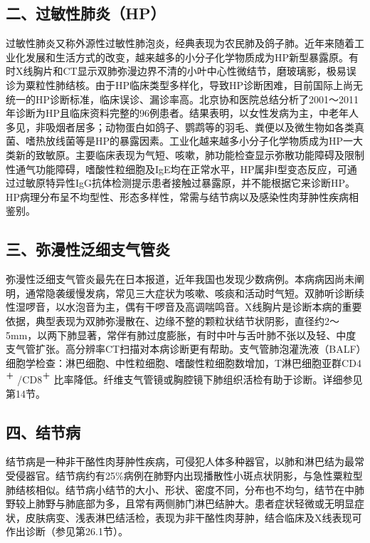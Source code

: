 \subsection{二、过敏性肺炎（HP）}

过敏性肺炎又称外源性过敏性肺泡炎，经典表现为农民肺及鸽子肺。近年来随着工业化发展和生活方式的改变，越来越多的小分子化学物质成为HP新型暴露原。有时X线胸片和CT显示双肺弥漫边界不清的小叶中心性微结节，磨玻璃影，极易误诊为粟粒性肺结核。由于HP临床类型多样化，导致HP诊断困难，目前国际上尚无统一的HP诊断标准，临床误诊、漏诊率高。北京协和医院总结分析了2001～2011年诊断为HP且临床资料完整的96例患者。结果表明，以女性发病为主，中老年人多见，非吸烟者居多；动物蛋白如鸽子、鹦鹉等的羽毛、粪便以及微生物如各类真菌、嗜热放线菌等是HP的暴露因素。工业化越来越多小分子化学物质成为HP一大类新的致敏原。主要临床表现为气短、咳嗽，肺功能检查显示弥散功能障碍及限制性通气功能障碍，嗜酸性粒细胞及IgE均在正常水平，HP属非Ⅰ型变态反应，可通过过敏原特异性IgG抗体检测提示患者接触过暴露原，并不能根据它来诊断HP。HP病理分布呈不均型性、形态多样性，常需与结节病以及感染性肉芽肿性疾病相鉴别。

\subsection{三、弥漫性泛细支气管炎}

弥漫性泛细支气管炎最先在日本报道，近年我国也发现少数病例。本病病因尚未阐明，通常隐袭缓慢发病，常见三大症状为咳嗽、咳痰和活动时气短。双肺听诊断续性湿啰音，以水泡音为主，偶有干啰音及高调喘鸣音。X线胸片是诊断本病的重要依据，典型表现为双肺弥漫散在、边缘不整的颗粒状结节状阴影，直径约2～5mm，以两下肺显著，常伴有肺过度膨胀，有时中叶与舌叶肺不张以及轻、中度支气管扩张。高分辨率CT扫描对本病诊断更有帮助。支气管肺泡灌洗液（BALF）细胞学检查：淋巴细胞、中性粒细胞、嗜酸性粒细胞数增加，T淋巴细胞亚群CD4\textsuperscript{＋}
/CD8\textsuperscript{＋}
比率降低。纤维支气管镜或胸腔镜下肺组织活检有助于诊断。详细参见第14节。

\subsection{四、结节病}

结节病是一种非干酪性肉芽肿性疾病，可侵犯人体多种器官，以肺和淋巴结为最常受侵器官。结节病约有25\%病例在肺野内出现播散性小斑点状阴影，与急性粟粒型肺结核相似。结节病小结节的大小、形状、密度不同，分布也不均匀，结节在中肺野较上肺野与肺底部为多，且常有两侧肺门淋巴结肿大。患者症状轻微或无明显症状，皮肤病变、浅表淋巴结活检，表现为非干酪性肉芽肿，结合临床及X线表现可作出诊断（参见第26.1节）。

